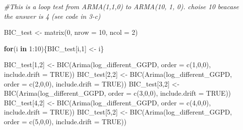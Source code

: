 \documentclass[
]{article}
\newenvironment{Shaded}{\begin{snugshade}}{\end{snugshade}}
\newcommand{\AttributeTok}[1]{\textcolor[rgb]{0.77,0.63,0.00}{#1}}
\newcommand{\CommentTok}[1]{\textcolor[rgb]{0.56,0.35,0.01}{\textit{#1}}}
\newcommand{\ConstantTok}[1]{\textcolor[rgb]{0.00,0.00,0.00}{#1}}
\newcommand{\ControlFlowTok}[1]{\textcolor[rgb]{0.13,0.29,0.53}{\textbf{#1}}}
\newcommand{\DecValTok}[1]{\textcolor[rgb]{0.00,0.00,0.81}{#1}}
\newcommand{\FunctionTok}[1]{\textcolor[rgb]{0.00,0.00,0.00}{#1}}
\newcommand{\NormalTok}[1]{#1}
\newcommand{\OtherTok}[1]{\textcolor[rgb]{0.56,0.35,0.01}{#1}}
\newcommand{\SpecialCharTok}[1]{\textcolor[rgb]{0.00,0.00,0.00}{#1}}
\begin{document}
\begin{Shaded}
\begin{Highlighting}[]
\CommentTok{\#This is a loop test from ARMA(1,1,0) to ARMA(10, 1, 0). choise 10 beacase the answer is 4 (see code in 3{-}c)}

\NormalTok{BIC\_test }\OtherTok{\textless{}{-}} \FunctionTok{matrix}\NormalTok{(}\DecValTok{0}\NormalTok{, }\AttributeTok{nrow =} \DecValTok{10}\NormalTok{, }\AttributeTok{ncol =} \DecValTok{2}\NormalTok{)}

\ControlFlowTok{for}\NormalTok{(i }\ControlFlowTok{in} \DecValTok{1}\SpecialCharTok{:}\DecValTok{10}\NormalTok{)\{BIC\_test[i,}\DecValTok{1}\NormalTok{] }\OtherTok{\textless{}{-}}\NormalTok{ i\}}

\NormalTok{BIC\_test[}\DecValTok{1}\NormalTok{,}\DecValTok{2}\NormalTok{] }\OtherTok{\textless{}{-}} \FunctionTok{BIC}\NormalTok{(}\FunctionTok{Arima}\NormalTok{(log\_different\_GGPD, }\AttributeTok{order =} \FunctionTok{c}\NormalTok{(}\DecValTok{1}\NormalTok{,}\DecValTok{0}\NormalTok{,}\DecValTok{0}\NormalTok{), }\AttributeTok{include.drift =} \ConstantTok{TRUE}\NormalTok{))}
\NormalTok{BIC\_test[}\DecValTok{2}\NormalTok{,}\DecValTok{2}\NormalTok{] }\OtherTok{\textless{}{-}} \FunctionTok{BIC}\NormalTok{(}\FunctionTok{Arima}\NormalTok{(log\_different\_GGPD, }\AttributeTok{order =} \FunctionTok{c}\NormalTok{(}\DecValTok{2}\NormalTok{,}\DecValTok{0}\NormalTok{,}\DecValTok{0}\NormalTok{), }\AttributeTok{include.drift =} \ConstantTok{TRUE}\NormalTok{))}
\NormalTok{BIC\_test[}\DecValTok{3}\NormalTok{,}\DecValTok{2}\NormalTok{] }\OtherTok{\textless{}{-}} \FunctionTok{BIC}\NormalTok{(}\FunctionTok{Arima}\NormalTok{(log\_different\_GGPD, }\AttributeTok{order =} \FunctionTok{c}\NormalTok{(}\DecValTok{3}\NormalTok{,}\DecValTok{0}\NormalTok{,}\DecValTok{0}\NormalTok{), }\AttributeTok{include.drift =} \ConstantTok{TRUE}\NormalTok{))}
\NormalTok{BIC\_test[}\DecValTok{4}\NormalTok{,}\DecValTok{2}\NormalTok{] }\OtherTok{\textless{}{-}} \FunctionTok{BIC}\NormalTok{(}\FunctionTok{Arima}\NormalTok{(log\_different\_GGPD, }\AttributeTok{order =} \FunctionTok{c}\NormalTok{(}\DecValTok{4}\NormalTok{,}\DecValTok{0}\NormalTok{,}\DecValTok{0}\NormalTok{), }\AttributeTok{include.drift =} \ConstantTok{TRUE}\NormalTok{))}
\NormalTok{BIC\_test[}\DecValTok{5}\NormalTok{,}\DecValTok{2}\NormalTok{] }\OtherTok{\textless{}{-}} \FunctionTok{BIC}\NormalTok{(}\FunctionTok{Arima}\NormalTok{(log\_different\_GGPD, }\AttributeTok{order =} \FunctionTok{c}\NormalTok{(}\DecValTok{5}\NormalTok{,}\DecValTok{0}\NormalTok{,}\DecValTok{0}\NormalTok{), }\AttributeTok{include.drift =} \ConstantTok{TRUE}\NormalTok{))}

\end{Highlighting}
\end{Shaded}
\end{document}
